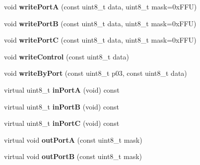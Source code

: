 \begin{DoxyCompactItemize}
\item 
\hypertarget{classIntel8255_a2b959c90c912c12e8d881cd21b59671e}{void {\bfseries write\-Port\-A} (const uint8\-\_\-t data, uint8\-\_\-t mask=0x\-F\-F\-U)}\label{classIntel8255_a2b959c90c912c12e8d881cd21b59671e}

\item 
\hypertarget{classIntel8255_a54bf45490f90f882c7ddba55bb9dcff3}{void {\bfseries write\-Port\-B} (const uint8\-\_\-t data, uint8\-\_\-t mask=0x\-F\-F\-U)}\label{classIntel8255_a54bf45490f90f882c7ddba55bb9dcff3}

\item 
\hypertarget{classIntel8255_ad08321013139ad0a6f168165ae8c68a7}{void {\bfseries write\-Port\-C} (const uint8\-\_\-t data, uint8\-\_\-t mask=0x\-F\-F\-U)}\label{classIntel8255_ad08321013139ad0a6f168165ae8c68a7}

\item 
\hypertarget{classIntel8255_a7f5bc4528c2d868b1530c45ee6172982}{void {\bfseries write\-Control} (const uint8\-\_\-t data)}\label{classIntel8255_a7f5bc4528c2d868b1530c45ee6172982}

\item 
\hypertarget{classIntel8255_afc2d37b28f019c4ba64495a19d37eb1a}{void {\bfseries write\-By\-Port} (const uint8\-\_\-t p03, const uint8\-\_\-t data)}\label{classIntel8255_afc2d37b28f019c4ba64495a19d37eb1a}

\item 
\hypertarget{classIntel8255_a387e1edf0b09feea29362f1854398237}{virtual uint8\-\_\-t {\bfseries in\-Port\-A} (void) const }\label{classIntel8255_a387e1edf0b09feea29362f1854398237}

\item 
\hypertarget{classIntel8255_a5e4a8c34778bef66b5d2ddcf7b372be1}{virtual uint8\-\_\-t {\bfseries in\-Port\-B} (void) const }\label{classIntel8255_a5e4a8c34778bef66b5d2ddcf7b372be1}

\item 
\hypertarget{classIntel8255_ac02d52c1bf5c0fb0478dfb0ffb1b8ec8}{virtual uint8\-\_\-t {\bfseries in\-Port\-C} (void) const }\label{classIntel8255_ac02d52c1bf5c0fb0478dfb0ffb1b8ec8}

\item 
\hypertarget{classIntel8255_a15b8c1a78f8f1ca7ac90b92cc329f7d0}{virtual void {\bfseries out\-Port\-A} (const uint8\-\_\-t mask)}\label{classIntel8255_a15b8c1a78f8f1ca7ac90b92cc329f7d0}

\item 
\hypertarget{classIntel8255_a3004cbfc1a1eade447d2e312bc1faa29}{virtual void {\bfseries out\-Port\-B} (const uint8\-\_\-t mask)}\label{classIntel8255_a3004cbfc1a1eade447d2e312bc1faa29}


\end{DoxyCompactItemize}
